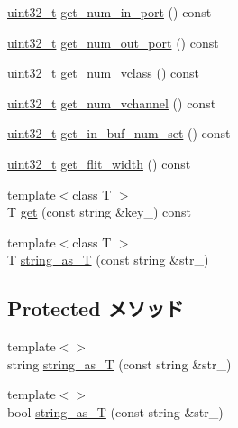 \begin{DoxyCompactItemize}
\item 
\hyperlink{Type_8hh_a435d1572bf3f880d55459d9805097f62}{uint32\_\-t} \hyperlink{classOrionConfig_a85aa1930884df17c5ef2af8bd262d3dd}{get\_\-num\_\-in\_\-port} () const 
\item 
\hyperlink{Type_8hh_a435d1572bf3f880d55459d9805097f62}{uint32\_\-t} \hyperlink{classOrionConfig_a118c10a9e6e7eaef34adea78511518f1}{get\_\-num\_\-out\_\-port} () const 
\item 
\hyperlink{Type_8hh_a435d1572bf3f880d55459d9805097f62}{uint32\_\-t} \hyperlink{classOrionConfig_a0ed55ecc19284bd411af0669a56e434e}{get\_\-num\_\-vclass} () const 
\item 
\hyperlink{Type_8hh_a435d1572bf3f880d55459d9805097f62}{uint32\_\-t} \hyperlink{classOrionConfig_a90e89a2a159f6cf707767a99e59b5395}{get\_\-num\_\-vchannel} () const 
\item 
\hyperlink{Type_8hh_a435d1572bf3f880d55459d9805097f62}{uint32\_\-t} \hyperlink{classOrionConfig_a83dc3b046850d0938f6eaab4bb6c7ab4}{get\_\-in\_\-buf\_\-num\_\-set} () const 
\item 
\hyperlink{Type_8hh_a435d1572bf3f880d55459d9805097f62}{uint32\_\-t} \hyperlink{classOrionConfig_a2a998ef1cdb6f08fd0843144a19adb36}{get\_\-flit\_\-width} () const 
\item 
{\footnotesize template$<$class T $>$ }\\T \hyperlink{classOrionConfig_ad4e4921359c27b857119ff2c03b6b549}{get} (const string \&key\_\-) const 
\item 
{\footnotesize template$<$class T $>$ }\\T \hyperlink{classOrionConfig_aeb46f3372898d79187ee6b8bda1d0653}{string\_\-as\_\-T} (const string \&str\_\-)
\end{DoxyCompactItemize}
\subsection*{Protected メソッド}
\begin{DoxyCompactItemize}
\item 
{\footnotesize template$<$$>$ }\\string \hyperlink{classOrionConfig_a56e435d7b2ac5ca70e2ce287128b0066}{string\_\-as\_\-T} (const string \&str\_\-)
\item 
{\footnotesize template$<$$>$ }\\bool \hyperlink{classOrionConfig_a0348546f8827bf517dcb6617d71e2a99}{string\_\-as\_\-T} (const string \&str\_\-)
\end{DoxyCompactItemize}
